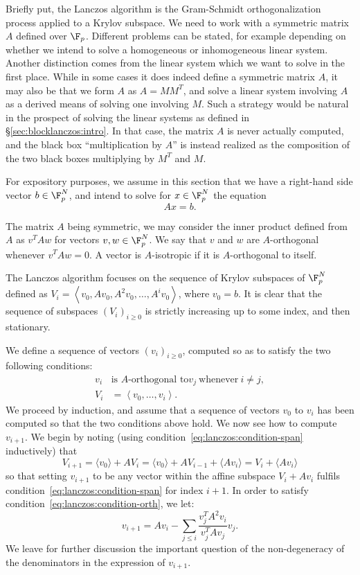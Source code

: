 Briefly put, the Lanczos algorithm is the Gram-Schmidt orthogonalization
process applied to a Krylov subspace. We need to work with a symmetric
matrix $A$ defined over $\F_p$.  Different problems can be stated, for
example depending on whether we intend to solve a homogeneous or
inhomogeneous linear system. Another distinction comes from the linear
system which we want to solve in the first place. While in some cases it
does indeed define a symmetric matrix $A$, it may also be that we form
$A$ as $A=MM^T$, and solve a linear system involving $A$ as a derived
means of solving one involving $M$. Such a strategy would be natural in
the prospect of solving the linear systems as defined in
§\ref{sec:blocklanczos:intro}. In that case, the matrix $A$ is never actually
computed, and the black box ``multiplication by $A$'' is instead realized
as the composition
of the two black boxes multiplying by $M^T$ and $M$.

For expository purposes, we assume in
this section that we have a right-hand side vector $b\in\F_p^N$,
and intend to solve for $x\in\F_p^{N}$ the equation
$$Ax=b.$$

The matrix $A$ being symmetric, we may consider
the inner product defined from $A$ as $v^TAw$ for 
vectors $v,w\in\F_p^N$. We say that $v$ and $w$ are $A$-orthogonal
whenever $v^TAw=0$. A vector is $A$-isotropic if it is $A$-orthogonal to
itself.

The Lanczos algorithm focuses on the sequence of Krylov subspaces of $\F_p^N$
defined as $V_i=\left\langle v_0,Av_0,A^2v_0,\ldots,A^{i}v_0\right\rangle$,
where $v_0=b$.
It is clear that the sequence of subspaces
$(V_i)_{i\geq0}$ is
strictly increasing up to some index, and then stationary.

We define a sequence of vectors $(v_i)_{i\geq0}$, 
computed so as to satisfy the two following conditions:
\begin{align}
    \label{eq:lanczos:condition-orth} v_i &\mathrel{\text{is $A$-orthogonal
to}}  v_j\ \text{whenever}\ i\not=j,\\
\label{eq:lanczos:condition-span} V_i &=\left\langle v_0,\ldots,v_{i}\right\rangle.
\end{align}
We proceed by induction, and assume that a sequence of vectors $v_0$ to
$v_i$ has been computed so that the two conditions above hold.
We now see how to compute $v_{i+1}$.
We begin by noting (using condition~\eqref{eq:lanczos:condition-span}
inductively) that $$V_{i+1}= \langle v_0\rangle+AV_i=\langle
v_0\rangle +AV_{i-1}+\langle Av_i\rangle=V_i+\langle Av_i\rangle$$
so
that setting $v_{i+1}$ to be any vector within the affine subspace
$V_i+Av_i$ fulfils condition~\eqref{eq:lanczos:condition-span} for
index $i+1$. In
order to satisfy condition~\eqref{eq:lanczos:condition-orth}, we let:
$$
    v_{i+1}
        = Av_i - \sum_{j\leq i}\frac{v_j^TA^2v_i}{v_j^TAv_j}v_j.
            $$
We leave for further discussion the important question of the
non-degeneracy of the denominators in the expression of $v_{i+1}$.

